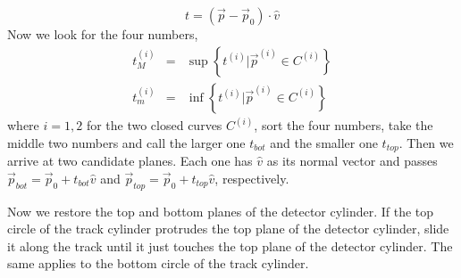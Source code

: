 \begin{equation}
	t=\left(\vec{p}-\vec{p}_0\right)\cdot \hat{v}
\end{equation}
Now we look for the four numbers,
\begin{eqnarray}
	t^{(i)}_M&=&\sup\left\{ t^{(i)}|\vec{p}^{(i)}\in C^{(i)}\right\} \\
	t^{(i)}_m&=&\inf\left\{ t^{(i)}|\vec{p}^{(i)}\in C^{(i)}\right\}
\end{eqnarray}
where $i=1,2$ for the two closed curves $C^{(i)}$, sort the four numbers, take the middle two numbers and call the larger one $t_{bot}$ and the smaller one $t_{top}$. Then we arrive at two candidate planes. Each one has $\hat{v}$ as its normal vector and passes $\vec{p}_{bot}=\vec{p}_0+t_{bot}\hat{v}$ and $\vec{p}_{top}=\vec{p}_0+t_{top}\hat{v}$, respectively.

Now we restore the top and bottom planes of the detector cylinder. If the top circle of the track cylinder protrudes the top plane of the detector cylinder, slide it along the track until it just touches the top plane of the detector cylinder. The same applies to the bottom circle of the track cylinder.